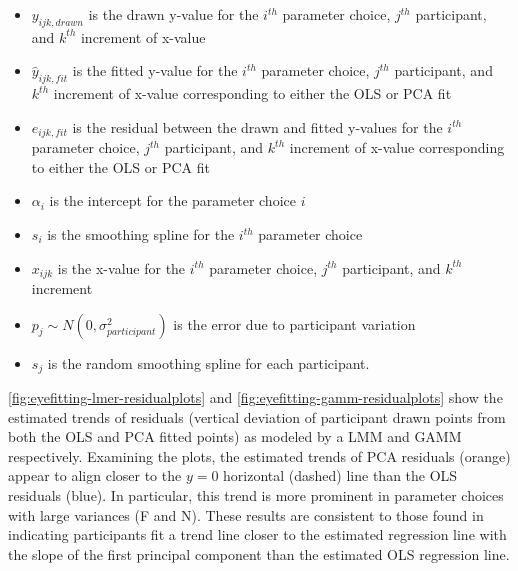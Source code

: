 \documentclass[12pt]{article}
\providecommand{\tightlist}{%
  \setlength{\itemsep}{0pt}\setlength{\parskip}{0pt}}
\begin{document}
\begin{itemize}
\tightlist
\item
  \(y_{ijk,drawn}\) is the drawn y-value for the \(i^{th}\) parameter
  choice, \(j^{th}\) participant, and \(k^{th}\) increment of x-value
\item
  \(\hat y_{ijk,fit}\) is the fitted y-value for the \(i^{th}\)
  parameter choice, \(j^{th}\) participant, and \(k^{th}\) increment of
  x-value corresponding to either the OLS or PCA fit
\item
  \(e_{ijk,fit}\) is the residual between the drawn and fitted y-values
  for the \(i^{th}\) parameter choice, \(j^{th}\) participant, and
  \(k^{th}\) increment of x-value corresponding to either the OLS or PCA
  fit
\item
  \(\alpha_i\) is the intercept for the parameter choice \(i\)
\item
  \(s_{i}\) is the smoothing spline for the \(i^{th}\) parameter choice
\item
  \(x_{ijk}\) is the x-value for the \(i^{th}\) parameter choice,
  \(j^{th}\) participant, and \(k^{th}\) increment
\item
  \(p_{j} \sim N(0, \sigma^2_{participant})\) is the error due to
  participant variation
\item
  \(s_{j}\) is the random smoothing spline for each participant.
\end{itemize}

\cref{fig:eyefitting-lmer-residualplots} and
\cref{fig:eyefitting-gamm-residualplots} show the estimated trends of
residuals (vertical deviation of participant drawn points from both the
OLS and PCA fitted points) as modeled by a LMM and GAMM respectively.
Examining the plots, the estimated trends of PCA residuals (orange)
appear to align closer to the \(y=0\) horizontal (dashed) line than the
OLS residuals (blue). In particular, this trend is more prominent in
parameter choices with large variances (F and N). These results are
consistent to those found in \citet{mosteller_eye_1981} indicating
participants fit a trend line closer to the estimated regression line
with the slope of the first principal component than the estimated OLS
regression line.
\end{document}
